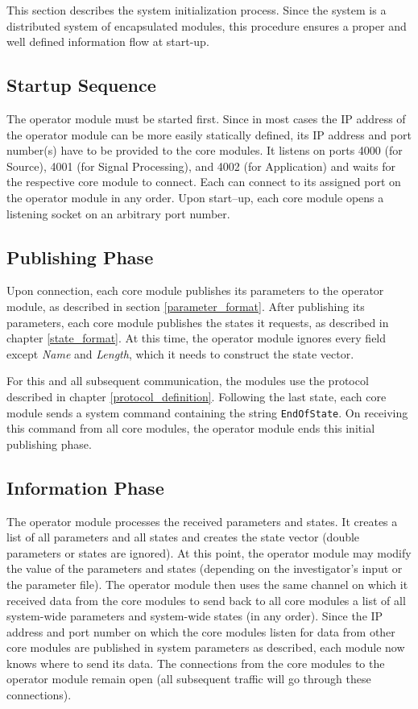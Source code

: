 \documentclass[letterpaper,oneside,12pt]{book}
\begin{document}
This section describes the system initialization process. Since the system is a 
distributed system of encapsulated modules, this procedure ensures a proper and 
well defined information flow at start-up.

\subsection{Startup Sequence}

The operator module must be started first. Since in most cases the IP address of 
the operator module can be more easily statically defined, its IP address and 
port number(s) have to be provided to the core modules. It listens on ports 4000 
(for Source), 4001 (for Signal Processing), and 4002 (for Application) and 
waits for the respective core module to connect. Each can connect to its 
assigned port on the operator module in any order. Upon start--up, each core 
module opens a listening socket on an arbitrary port number.

\subsection{Publishing Phase}

Upon connection, each core module publishes its parameters to the operator 
module, as described in section \ref{parameter_format}. After publishing its 
parameters, each core module publishes the states it requests, as described in 
chapter \ref{state_format}. At this time, the operator module ignores every 
field except \textit{Name} and \textit{Length}, which it needs to construct the 
state vector.

For this and all subsequent communication, the modules use the protocol 
described in chapter \ref{protocol_definition}. Following the last state, each core module sends a system command containing the string \texttt{EndOfState}.
On receiving this command from all core modules, the operator module ends 
this initial publishing phase.

\subsection{Information Phase}

The operator module processes the received parameters and states. It creates a 
list of all parameters and all states and creates the state vector (double 
parameters or states are ignored). At this point, the operator module may modify 
the value of the parameters and states (depending on the investigator's input or 
the parameter file). The operator module then uses the same channel on which it 
received data from the core modules to send back to all core modules a list of 
all system-wide parameters and system-wide states (in any order). Since the IP 
address and port number on which the core modules listen for data from other 
core modules are published in system parameters as described, each module now 
knows where to send its data. The connections from the core modules to the 
operator module remain open (all subsequent traffic will go through these 
connections).
\end{document}
